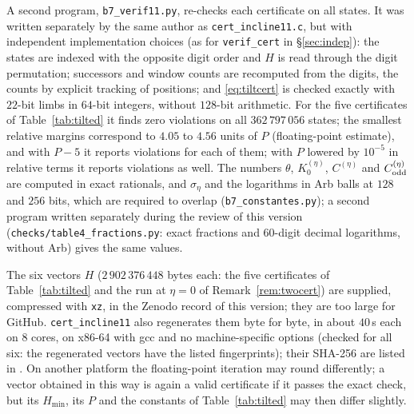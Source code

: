 \documentclass[11pt,a4paper]{article}
\theoremstyle{plain}
\theoremstyle{remark}
\numberwithin{equation}{section}
\begin{document}
A second program, \texttt{b7\_verif11.py}, re-checks each certificate on all states. It was written separately by the same author
as \texttt{cert\_incline11.c}, but with independent implementation choices (as for \texttt{verif\_cert} in \S\ref{sec:indep}): the
states are indexed with the opposite digit order and $H$ is read through the digit permutation; successors and window counts are recomputed from the
digits, the counts by explicit tracking of positions; and \eqref{eq:tiltcert} is checked exactly with $22$-bit limbs in $64$-bit integers,
without $128$-bit arithmetic. For the five certificates of Table~\ref{tab:tilted} it finds zero violations on all $362\,797\,056$ states;
the smallest relative margins correspond to $4.05$ to $4.56$ units of $P$ (floating-point estimate), and with $P-5$ it reports violations
for each of them; with $P$ lowered by $10^{-5}$ in relative terms it reports violations as well. The numbers $\theta$, $K_0^{(\eta)}$, $C^{(\eta)}$ and $C^{(\eta)}_{\rm odd}$ are computed in exact rationals, and
$\sigma_\eta$ and the logarithms in Arb balls at $128$ and $256$ bits, which are required to overlap (\texttt{b7\_constantes.py}); a
second program written separately during the review of this version (\texttt{checks/table4\_fractions.py}: exact fractions and
$60$-digit decimal logarithms, without Arb) gives the same values.

The six vectors $H$ ($2\,902\,376\,448$ bytes each: the five certificates of Table~\ref{tab:tilted} and the run at $\eta=0$ of
Remark~\ref{rem:twocert}) are supplied, compressed with \texttt{xz}, in the Zenodo record of this version; they are too large for
GitHub. \texttt{cert\_incline11} also regenerates them byte for byte, in about $40$\,s each on $8$ cores, on x86-64 with gcc and no
machine-specific options (checked for all six: the regenerated vectors have the listed fingerprints); their SHA-256 are listed in
. On another platform the floating-point iteration may round differently; a vector obtained in this way is again a
valid certificate if it passes the exact check, but its $H_{\min}$, its $P$ and the constants of Table~\ref{tab:tilted} may then differ
slightly.
\end{document}

